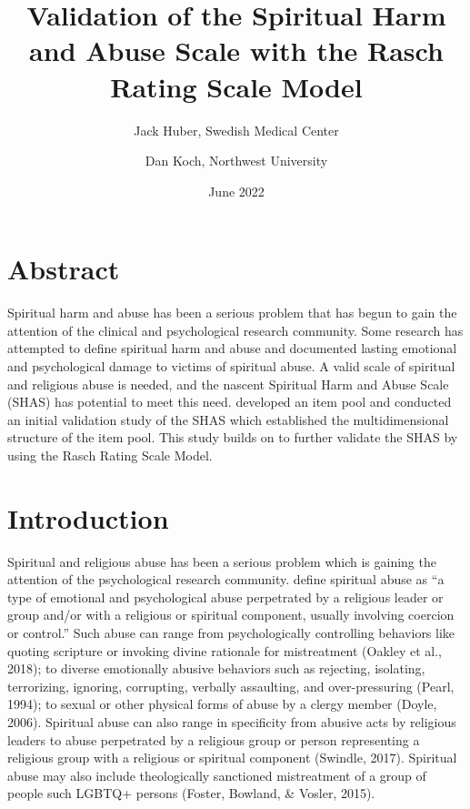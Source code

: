 \documentclass[
]{article}
\title{Validation of the Spiritual Harm and Abuse Scale with the Rasch Rating Scale Model}
\author{Jack Huber, Swedish Medical Center \and Dan Koch, Northwest University}
\date{June 2022}
\begin{document}
\maketitle

\hypertarget{abstract}{%
\section{Abstract}\label{abstract}}

Spiritual harm and abuse has been a serious problem that has begun to gain the attention of the clinical and psychological research community. Some research has attempted to define spiritual harm and abuse and documented lasting emotional and psychological damage to victims of spiritual abuse. A valid scale of spiritual and religious abuse is needed, and the nascent Spiritual Harm and Abuse Scale (SHAS) has potential to meet this need. \citet{KochEdstrom2022} developed an item pool and conducted an initial validation study of the SHAS which established the multidimensional structure of the item pool. This study builds on \citet{KochEdstrom2022} to further validate the SHAS by using the Rasch Rating Scale Model.

\hypertarget{introduction}{%
\section{Introduction}\label{introduction}}

Spiritual and religious abuse has been a serious problem which is gaining the attention of the psychological research community. \citet{KochEdstrom2022} define spiritual abuse as ``a type of emotional and psychological abuse perpetrated by a religious leader or group and/or with a religious or spiritual component, usually involving coercion or control.'' Such abuse can range from psychologically controlling behaviors like quoting scripture or invoking divine rationale for mistreatment (Oakley et al., 2018); to diverse emotionally abusive behaviors such as rejecting, isolating, terrorizing, ignoring, corrupting, verbally assaulting, and over-pressuring (Pearl, 1994); to sexual or other physical forms of abuse by a clergy member (Doyle, 2006). Spiritual abuse can also range in specificity from abusive acts by religious leaders to abuse perpetrated by a religious group or person representing a religious group with a religious or spiritual component (Swindle, 2017). Spiritual abuse may also include theologically sanctioned mistreatment of a group of people such LGBTQ+ persons (Foster, Bowland, \& Vosler, 2015).
\end{document}
